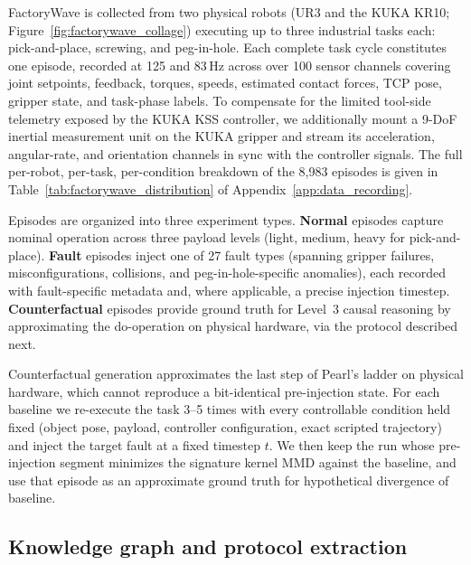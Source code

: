 FactoryWave is collected from two physical robots (UR3 and the KUKA KR10; Figure~\ref{fig:factorywave_collage}) executing up to three industrial tasks each: pick-and-place, screwing, and peg-in-hole. Each complete task cycle constitutes one episode, recorded at 125 and 83\,Hz across over 100 sensor channels covering joint setpoints, feedback, torques, speeds, estimated contact forces, TCP pose, gripper state, and task-phase labels. To compensate for the limited tool-side telemetry exposed by the KUKA KSS controller, we additionally mount a 9-DoF inertial measurement unit on the KUKA gripper and stream its acceleration, angular-rate, and orientation channels in sync with the controller signals. The full per-robot, per-task, per-condition breakdown of the 8{,}983 episodes is given in Table~\ref{tab:factorywave_distribution} of Appendix~\ref{app:data_recording}.

Episodes are organized into three experiment types. \textbf{Normal} episodes capture nominal operation across three payload levels (light, medium, heavy for pick-and-place). \textbf{Fault} episodes inject one of 27 fault types (spanning gripper failures, misconfigurations, collisions, and peg-in-hole-specific anomalies), each recorded with fault-specific metadata and, where applicable, a precise injection timestep. \textbf{Counterfactual} episodes provide ground truth for Level~3 causal reasoning by approximating the do-operation on physical hardware, via the protocol described next.

Counterfactual generation approximates the last step of Pearl's ladder on physical hardware, which cannot reproduce a bit-identical pre-injection state. For each baseline we re-execute the task 3--5 times with every controllable condition held fixed (object pose, payload, controller configuration, exact scripted trajectory) and inject the target fault at a fixed timestep $t$. We then keep the run whose pre-injection segment minimizes the signature kernel MMD against the baseline, and use that episode as an approximate ground truth for hypothetical divergence of baseline.

\subsection{Knowledge graph and protocol extraction}
\label{sec:knowledge-graph}

